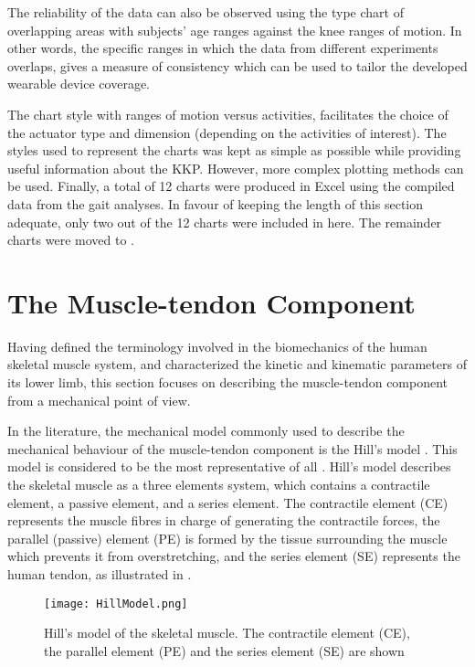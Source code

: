 The reliability of the data can also be observed using the type chart of overlapping areas with subjects' age ranges against the knee ranges of motion. In other words, the specific ranges in which the data from different experiments overlaps, gives a measure of consistency which can be used to tailor the developed wearable device coverage. 

The chart style with ranges of motion versus activities, facilitates the choice of the actuator type and dimension (depending on the activities of interest). The styles used to represent the charts was kept as simple as possible while providing useful information about the KKP. However, more complex plotting methods can be used. Finally, a total of 12 charts were produced in Excel\textregistered{} using the compiled data from the gait analyses. In favour of keeping the length of this section adequate, only two out of the 12 charts were included in here. The remainder charts were moved to .

\section{The Muscle-tendon Component} \label{sec:muscle_tendon}

Having defined the terminology involved in the biomechanics of the human skeletal muscle system, and characterized the kinetic and kinematic parameters of its lower limb, this section focuses on describing the muscle-tendon component from a mechanical point of view. 

In the literature, the mechanical model commonly used to describe the mechanical behaviour of the muscle-tendon component is the Hill's model \cite{hill1938heat}. This model is considered to be the most representative of all \cite{zhang2012sma}. Hill's model describes the skeletal muscle as a three elements system, which contains a contractile element, a passive element, and a series element. The contractile element (CE) represents the muscle fibres in charge of generating the contractile forces, the parallel (passive) element (PE) is formed by the tissue surrounding the muscle which prevents it from overstretching, and the series element (SE) represents the human tendon, as illustrated in .

\begin{figure}[htb!]
    \centering
    \texttt{[image: HillModel.png]}
    \caption{Hill's model of the skeletal muscle. The contractile element (CE), the parallel element (PE) and the series element (SE) are shown \cite{hill1938heat} }
    \label{fig:hillModel}
\end{figure}

